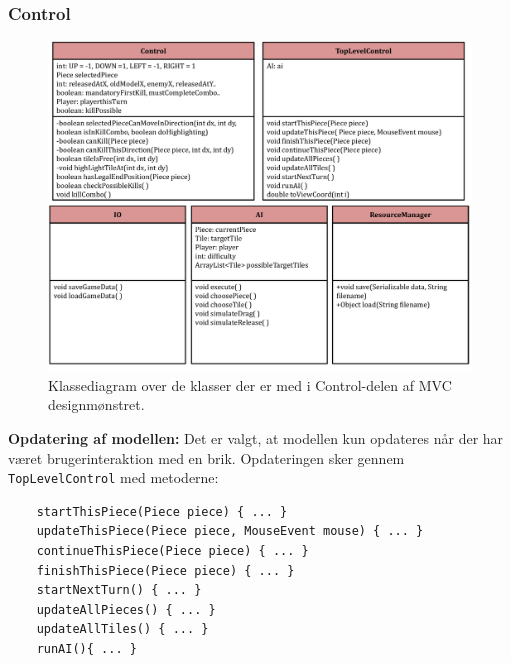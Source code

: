 \subsubsection{Control}
\begin{figure}[H]
\centering
\includegraphics[width = 1.0  \textwidth]{Figurer/classesControl.pdf}
\caption{Klassediagram over de klasser der er med i Control-delen af MVC designmønstret.}
\label{fig:classesControl}
\end{figure}
\textbf{Opdatering af modellen:} 
Det er valgt, at modellen kun opdateres når der har været brugerinteraktion med en brik. Opdateringen sker gennem \texttt{TopLevelControl} med metoderne: 

\begin{lstlisting}
    startThisPiece(Piece piece) { ... }
    updateThisPiece(Piece piece, MouseEvent mouse) { ... }
    continueThisPiece(Piece piece) { ... }
    finishThisPiece(Piece piece) { ... }
    startNextTurn() { ... }
    updateAllPieces() { ... }
    updateAllTiles() { ... }
    runAI(){ ... }
\end{lstlisting}


